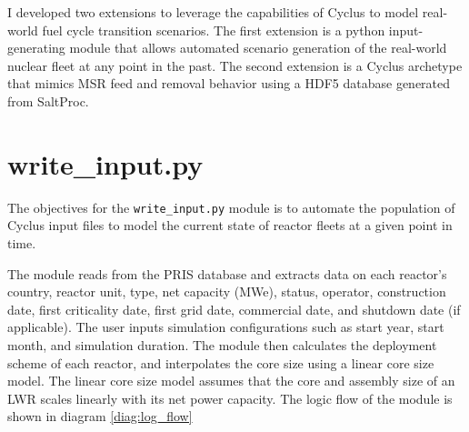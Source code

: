 I developed two extensions to leverage 
the capabilities of Cyclus to model
real-world fuel cycle transition scenarios.
The first extension is a python input-generating module
that allows automated scenario generation of the real-world 
nuclear fleet at any point in the past. The second extension
is a Cyclus archetype that mimics \gls{MSR} feed and removal
behavior using a HDF5 database generated from SaltProc.

\section{write\_input.py}
The objectives for the \texttt{write\_input.py} module
is to automate the population of Cyclus input files
to model the current state of reactor fleets at a given
point in time. 

The module reads from the \gls{PRIS} database
and extracts data on each reactor's country, reactor unit,
type, net capacity (MWe), status, operator, construction date,
first criticality date, first grid date, commercial date,
and shutdown date (if applicable). The user inputs simulation
configurations such as start year, start month, and
simulation duration. The module then calculates the deployment
scheme of each reactor, and interpolates the core size using
a linear core size model. The linear core size model assumes
that the core and assembly size of an \gls{LWR} scales linearly
with its net power capacity. The logic flow of the module is 
shown in diagram \ref{diag:log_flow}


